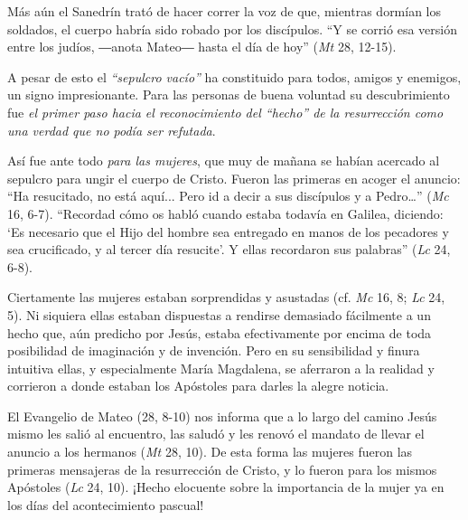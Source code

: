 			\begin{body}Más aún el Sanedrín trató de hacer correr la voz de que, mientras dormían los soldados, el cuerpo habría sido robado por los discípulos. “Y se corrió esa versión entre los judíos, ―anota Mateo― hasta el día de hoy” (\textit{Mt }28, 12-15).\end{body}
			
			\begin{body}A pesar de esto el \textit{“sepulcro vacío” }ha constituido para todos, amigos y enemigos, un signo impresionante. Para las personas de buena voluntad su descubrimiento fue \textit{el primer paso hacia el reconocimiento del “hecho” de la resurrección como una verdad que no podía ser refutada}.\end{body}
			
			\begin{body}Así fue ante todo \textit{para las mujeres}, que muy de mañana se habían acercado al sepulcro para ungir el cuerpo de Cristo. Fueron las primeras en acoger el anuncio: “Ha resucitado, no está aquí... Pero id a decir a sus discípulos y a Pedro…” (\textit{Mc} 16, 6-7). “Recordad cómo os habló cuando estaba todavía en Galilea, diciendo: ‘Es necesario que el Hijo del hombre sea entregado en manos de los pecadores y sea crucificado, y al tercer día resucite’. Y ellas recordaron sus palabras” (\textit{Lc} 24, 6-8).\end{body}
			
			\begin{body}Ciertamente las mujeres estaban sorprendidas y asustadas (cf. \textit{Mc }16, 8; \textit{Lc }24, 5). Ni siquiera ellas estaban dispuestas a rendirse demasiado fácilmente a un hecho que, aún predicho por Jesús, estaba efectivamente por encima de toda posibilidad de imaginación y de invención. Pero en su sensibilidad y finura intuitiva ellas, y especialmente María Magdalena, se aferraron a la realidad y corrieron a donde estaban los Apóstoles para darles la alegre noticia.\end{body}
			
			\begin{body}El Evangelio de Mateo (28, 8-10) nos informa que a lo largo del camino Jesús mismo les salió al encuentro, las saludó y les renovó el mandato de llevar el anuncio a los hermanos (\textit{Mt }28, 10). De esta forma las mujeres fueron las primeras mensajeras de la resurrección de Cristo, y lo fueron para los mismos Apóstoles (\textit{Lc }24, 10). ¡Hecho elocuente sobre la importancia de la mujer ya en los días del acontecimiento pascual!\end{body}
			
